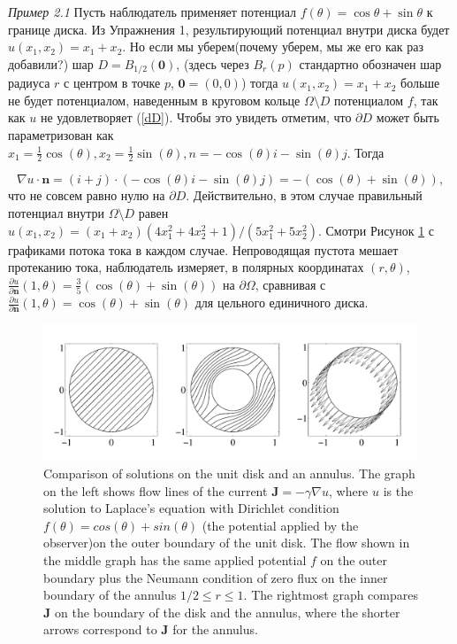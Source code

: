 \documentclass[a4paper, 12pt]{article}
\begin{document}
\textit{Пример 2.1} Пусть наблюдатель применяет потенциал $f(\theta) = \cos \theta + \sin \theta$ к границе диска. Из Упражнения 1, результирующий потенциал внутри диска будет $u(x_1, x_2) = x_1 + x_2$. Но если мы уберем(почему уберем, мы же его как раз добавили?) шар $D = B_{1/2}(\textbf{0})$, (здесь через $B_{r}(p)$ стандартно обозначен шар радиуса $r$ с центром в точке $p$, $\textbf{0} = (0, 0)$) тогда $u(x_1, x_2) = x_1 + x_2$ больше не будет потенциалом, наведенным в круговом кольце $\Omega \setminus D$ потенциалом $f$, так как $u$ не удовлетворяет (\ref{dD}). Чтобы это увидеть отметим, что $\partial D$ может быть параметризован как $x_1 = \frac{1}{2} \cos (\theta), x_2 = \frac{1}{2} \sin (\theta), n = -\cos (\theta) i - \sin (\theta) j$. Тогда

\begin{equation*}
\nabla u \cdot \textbf{n} = (i + j) \cdot (-\cos (\theta) i - \sin (\theta) j) = -(\cos(\theta)+\sin(\theta)),
\end{equation*}
что не совсем равно нулю на $\partial D$. Действительно, в этом случае
правильный потенциал внутри $\Omega \setminus D$ равен $u(x_1, x_2) =
(x_1 + x_2)(4x_1^2 + 4x_2^2 + 1)/(5x_1^2 + 5x_2^2)$. Смотри Рисунок
\ref{fig:3} с графиками потока тока в каждом случае. Непроводящая
пустота мешает протеканию тока, наблюдатель измеряет, в полярных
координатах $(r, \theta)$, $\frac{\partial u}{\partial \textbf{n}}(1,
\theta) = \frac{3}{5}(\cos(\theta)+\sin(\theta))$ на $\partial
\Omega$, сравнивая с $\frac{\partial u}{\partial \textbf{n}}(1,
\theta) = \cos(\theta)+\sin(\theta)$ для цельного единичного диска.
\begin{figure}[t]
  \centering
  \includegraphics[height=0.15\paperheight]{3.png}
  \caption{Comparison of solutions on the unit disk and an
    annulus. The graph on the left shows flow lines of the current
    $\mathbf J = −\gamma \nabla u$, where $u$ is the solution to
    Laplace’s equation with Dirichlet condition $f(\theta) =
    cos(\theta) + sin(\theta)$ (the potential applied by the
    observer)on the outer boundary of the unit disk. The flow shown in
    the middle graph has the same applied potential $f$ on the outer
    boundary plus the Neumann condition of zero flux on the inner
    boundary of the annulus $1/2 \leq r \leq 1$. The rightmost graph
    compares $\mathbf J$ on the boundary of the disk and the annulus,
    where the shorter arrows correspond to $\mathbf J$ for the
    annulus.}
  \label{fig:3}
\end{figure}
\end{document}
